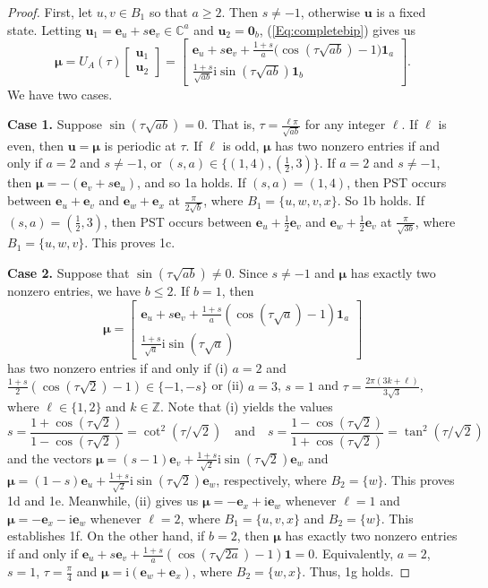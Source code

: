 \documentclass[10pt,a4paper]{amsart}
\def\C{\mathbb{C}}
\def\Z{\mathbb{Z}}
\newcommand{\be}{\mathbf e}
\newcommand{\bmu}{{\boldsymbol{\mu}}}
\newcommand{\bu}{\mathbf u}
\def\ii{\mathrm{i}}
\newcommand{\uno}{\mathbf 1}
\newcommand{\zero}{\mathbf 0}
\begin{document}
\begin{proof}
First, let $u,v\in B_1$ so that $a\geq 2$. Then $s\neq -1$, otherwise $\bu$ is a fixed state. Letting $\bu_1=\be_u+s\be_v\in\C^a$ and $\bu_2=\zero_b$, (\ref{Eq:completebip}) gives us
\begin{equation*}
\bmu=U_A(\tau)\begin{bmatrix}
\bu_1\\ \bu_2\end{bmatrix}=\begin{bmatrix}
\be_u+s\be_v+\frac{1+s}{a}\big(\cos( \tau\sqrt{ab})-1\big)\uno_a \\ \frac{1+s}{\sqrt{ab}}\ii\sin( \tau\sqrt{ab})\uno_b
\end{bmatrix}. 
\end{equation*}
We have two cases. 

\noindent \textbf{Case 1.} Suppose $\sin( \tau\sqrt{ab})=0$. That is, $\tau=\frac{\ell\pi}{\sqrt{ab}}$ for any integer $\ell$. If $\ell$ is even, then $\bu=\bmu$ is periodic at $\tau$. If $\ell$ is odd, 
$\bmu$ has two nonzero entries if and only if $a=2$ and $s\neq -1$, or $(s,a)\in\{(1,4),(\frac{1}{2},3)\}$. If $a=2$ and $s\neq -1$, then $\bmu=-(\be_v+s\be_u)$, and so 1a holds. If $(s,a)=(1,4)$, then PST occurs between $\be_u+\be_v$ and $\be_w+\be_x$ at $\frac{\pi}{2\sqrt{b}}$, where $B_1=\{u,w,v,x\}$. So 1b holds. If $(s,a)=(\frac{1}{2},3)$, then PST occurs between $\be_u+\frac{1}{2}\be_v$ and $\be_w+\frac{1}{2}\be_v$ at $\frac{\pi}{\sqrt{3b}}$, where $B_1=\{u,w,v\}$. This proves 1c. 

\noindent \textbf{Case 2.} Suppose that $\sin( \tau\sqrt{ab})\neq 0$. Since $s\neq -1$ and $\bmu$ has exactly two nonzero entries, we have $b\leq 2$. If $b=1$, then
\begin{equation*}
\bmu=\begin{bmatrix}
\be_u+s\be_v+\frac{1+s}{a}(\cos(\tau\sqrt{a})-1)\uno_a \\ \frac{1+s}{\sqrt{a}}\ii\sin(\tau\sqrt{a})
\end{bmatrix}
\end{equation*}
has two nonzero entries if and only if (i) $a=2$ and $\frac{1+s}{2}(\cos(\tau\sqrt{2})-1)\in\{-1,-s\}$ or (ii) $a=3$, $s=1$ and $\tau=\frac{2\pi(3k+\ell)}{3\sqrt{3}}$, where $\ell\in\{1,2\}$ and $k\in\Z$. Note that (i) yields the values 
\begin{equation*}
s=\dfrac{1+\cos(\tau\sqrt{2})}{1-\cos(\tau\sqrt{2})}=\cot^2(\tau/\sqrt{2})\quad  \text{and} \quad s=\dfrac{1-\cos(\tau\sqrt{2})}{1+\cos(\tau\sqrt{2})}=\tan^2(\tau/\sqrt{2})
\end{equation*}
and the vectors $\bmu=(s-1)\be_v+\frac{1+s}{\sqrt{2}}\ii\sin(\tau\sqrt{2})\be_w$ and $\bmu=(1-s)\be_u+\frac{1+s}{\sqrt{2}}\ii\sin(\tau\sqrt{2})\be_w$,
respectively, where $B_2=\{w\}$. This proves 1d and 1e. Meanwhile, (ii) gives us $\bmu=-\be_x+\ii\be_w$ whenever $\ell=1$ and $\bmu=-\be_x-\ii\be_w$ whenever $\ell=2$, where $B_1=\{u,v,x\}$ and $B_2=\{w\}$. This establishes 1f. On the other hand, if $b=2$, then $\bmu$ has exactly two nonzero entries if and only if $\be_u+s\be_v+\frac{1+s}{a}(\cos(\tau\sqrt{2a})-1)\uno=0$. Equivalently, $a=2$, $s=1$, $\tau=\frac{\pi}{4}$ and $\bmu=\ii (\be_w+\be_x)$, where $B_2=\{w,x\}$. Thus, 1g holds.


\end{proof}
\end{document}
